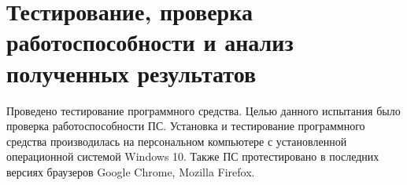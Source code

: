 \newcommand{\connectButton}{<<Connect to IP camera>>}
\newcommand{\ipInput}{<<IP address>>}
\newcommand{\nameInput}{<<Camera name>>}
\newcommand{\imrPage}{<<Image>>}
\newcommand{\submitButton}{<<Submit>>}
\newcommand{\selectButton}{<<Select Image>>}
\newcommand{\pluginFolder}{<<plugins>>}



\section{Тестирование, проверка работоспособности и анализ полученных результатов} %
\label{sec:testing}

Проведено тестирование программного средства. Целью данного испытания было проверка работоспособности ПС. 
Установка и тестирование программного средства производилась на персональном компьютере с установленной операционной системой Windows 10. Также ПС протестировано в последних версиях браузеров Google Chrome, Mozilla Firefox.


